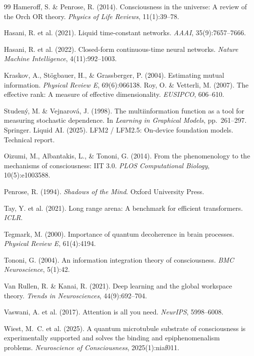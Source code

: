 \documentclass[11pt]{article}
\theoremstyle{definition}
\begin{document}
\begin{thebibliography}{99}
Hameroff, S. \& Penrose, R. (2014). Consciousness in the universe: A review of the Orch OR theory. \textit{Physics of Life Reviews}, 11(1):39--78.

Hasani, R. et al. (2021). Liquid time-constant networks. \textit{AAAI}, 35(9):7657--7666.

Hasani, R. et al. (2022). Closed-form continuous-time neural networks. \textit{Nature Machine Intelligence}, 4(11):992--1003.

Kraskov, A., St{\"o}gbauer, H., \& Grassberger, P. (2004). Estimating mutual information. \textit{Physical Review E}, 69(6):066138.
Roy, O. \& Vetterli, M. (2007). The effective rank: A measure of effective dimensionality. \textit{EUSIPCO}, 606--610.

Studen{\'{y}}, M. \& Vejnarov{\'{a}}, J. (1998). The multiinformation function as a tool for measuring stochastic dependence. In \textit{Learning in Graphical Models}, pp.\ 261--297. Springer.
Liquid AI. (2025). LFM2 / LFM2.5: On-device foundation models. Technical report.

Oizumi, M., Albantakis, L., \& Tononi, G. (2014). From the phenomenology to the mechanisms of consciousness: IIT 3.0. \textit{PLOS Computational Biology}, 10(5):e1003588.

Penrose, R. (1994). \textit{Shadows of the Mind}. Oxford University Press.

Tay, Y. et al. (2021). Long range arena: A benchmark for efficient transformers. \textit{ICLR}.

Tegmark, M. (2000). Importance of quantum decoherence in brain processes. \textit{Physical Review E}, 61(4):4194.

Tononi, G. (2004). An information integration theory of consciousness. \textit{BMC Neuroscience}, 5(1):42.

Van Rullen, R. \& Kanai, R. (2021). Deep learning and the global workspace theory. \textit{Trends in Neurosciences}, 44(9):692--704.

Vaswani, A. et al. (2017). Attention is all you need. \textit{NeurIPS}, 5998--6008.

Wiest, M.~C. et al. (2025). A quantum microtubule substrate of consciousness is experimentally supported and solves the binding and epiphenomenalism problems. \textit{Neuroscience of Consciousness}, 2025(1):niaf011.

\end{thebibliography}
\end{document}
